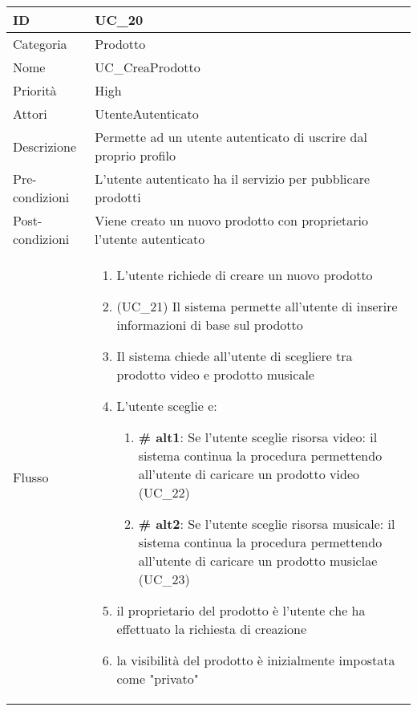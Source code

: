 \begin{center}
\begin{tabular}{ |p{2cm}|p{13cm}|  }
\hline
ID & UC\_20\\\hline
Categoria & Prodotto \\\hline
Nome & UC\_CreaProdotto \\\hline
Priorità & High \\\hline
Attori &  UtenteAutenticato \\\hline
Descrizione & Permette ad un utente autenticato di uscrire dal proprio profilo \\\hline
Pre-condizioni &  L'utente autenticato ha il servizio per pubblicare prodotti\\\hline
Post-condizioni &  Viene creato un nuovo prodotto con proprietario l'utente autenticato\\\hline
Flusso &  	\begin{enumerate}
			\item L'utente richiede di creare un nuovo prodotto
			\item (UC\_21) Il sistema permette all'utente di inserire informazioni di base sul prodotto
			\item Il sistema chiede all'utente di scegliere tra prodotto video e prodotto musicale
			\item L'utente sceglie e:
			\begin{enumerate}[  ]
				\item \textbf{\# alt1}: Se l'utente sceglie risorsa video: il sistema continua la procedura permettendo all'utente di caricare un prodotto video (UC\_22)
				\item \textbf{\# alt2}: Se l'utente sceglie risorsa musicale: il sistema continua la procedura permettendo all'utente di caricare un prodotto musiclae (UC\_23)
			\end{enumerate}
			\item il proprietario del prodotto è l'utente che ha effettuato la richiesta di creazione
			\item la visibilità del prodotto è inizialmente impostata come "privato"
		\end{enumerate}\\\hline
\end{tabular}
\label{table_use_case:20}\newline


\end{center}
